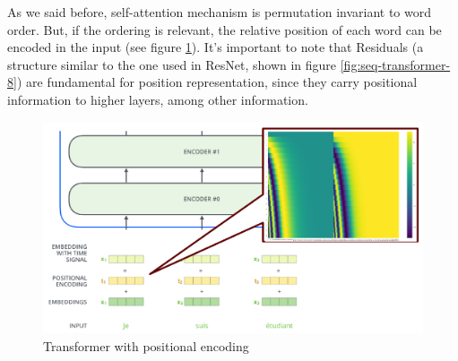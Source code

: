 As we said before, self-attention mechanism is permutation invariant to word order. But, if the ordering is relevant, the relative position of each word can be encoded in the input (see figure \ref{fig:seq-transformer-7}). It's important to note that Residuals (a structure similar to the one used in ResNet, shown in figure \ref{fig:seq-transformer-8}) are fundamental for position representation, since they carry positional information to higher layers, among other information.

\begin{minipage}{.6\linewidth}
    \begin{figure}[H]
        \centering
        \includegraphics[width=0.95\linewidth]{images/seq-transformer-7}
        \caption[Transformer with positional encoding]{Transformer with positional encoding}
        \label{fig:seq-transformer-7}
    \end{figure}    
\end{minipage}
